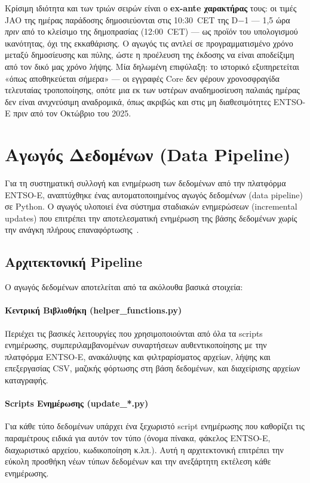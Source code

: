 Κρίσιμη ιδιότητα και των τριών σειρών είναι ο \textbf{ex-ante χαρακτήρας} τους: οι τιμές JAO της ημέρας παράδοσης δημοσιεύονται στις 10:30~CET της D$-$1 --- 1,5 ώρα \emph{πριν} από το κλείσιμο της δημοπρασίας (12:00~CET) --- ως προϊόν του υπολογισμού ικανότητας, όχι της εκκαθάρισης. Ο αγωγός τις αντλεί σε προγραμματισμένο χρόνο μεταξύ δημοσίευσης και πύλης, ώστε η προέλευση της έκδοσης να είναι αποδείξιμη από τον δικό μας χρόνο λήψης. Μία δηλωμένη επιφύλαξη: το ιστορικό εξυπηρετείται «όπως αποθηκεύεται σήμερα» --- οι εγγραφές Core δεν φέρουν χρονοσφραγίδα τελευταίας τροποποίησης, οπότε μια εκ των υστέρων αναδημοσίευση παλαιάς ημέρας δεν είναι ανιχνεύσιμη αναδρομικά, όπως ακριβώς και στις μη διαθεσιμότητες ENTSO-E πριν από τον Οκτώβριο του 2025.


\section{Αγωγός Δεδομένων (Data Pipeline)}
\label{sec:data-pipeline}

Για τη συστηματική συλλογή και ενημέρωση των δεδομένων από την πλατφόρμα ENTSO-E, αναπτύχθηκε ένας αυτοματοποιημένος αγωγός δεδομένων (data pipeline) σε Python. Ο αγωγός υλοποιεί ένα σύστημα σταδιακών ενημερώσεων (incremental updates) που επιτρέπει την αποτελεσματική ενημέρωση της βάσης δεδομένων χωρίς την ανάγκη πλήρους επαναφόρτωσης~\cite{kleppmann2017}.

\subsection{Αρχιτεκτονική Pipeline}
\label{subsec:pipeline-architecture}

Ο αγωγός δεδομένων αποτελείται από τα ακόλουθα βασικά στοιχεία:

\paragraph{Κεντρική Βιβλιοθήκη (helper\_functions.py)}
Περιέχει τις βασικές λειτουργίες που χρησιμοποιούνται από όλα τα scripts ενημέρωσης, συμπεριλαμβανομένων συναρτήσεων αυθεντικοποίησης με την πλατφόρμα ENTSO-E, ανακάλυψης και φιλτραρίσματος αρχείων, λήψης και επεξεργασίας CSV, μαζικής φόρτωσης στη βάση δεδομένων, και διαχείρισης αρχείων καταγραφής.

\paragraph{Scripts Ενημέρωσης (update\_*.py)}
Για κάθε τύπο δεδομένων υπάρχει ένα ξεχωριστό script ενημέρωσης που καθορίζει τις παραμέτρους ειδικά για αυτόν τον τύπο (όνομα πίνακα, φάκελος ENTSO-E, διαχωριστικό αρχείου, κωδικοποίηση κ.λπ.). Αυτή η αρχιτεκτονική επιτρέπει την εύκολη προσθήκη νέων τύπων δεδομένων και την ανεξάρτητη εκτέλεση κάθε ενημέρωσης.

